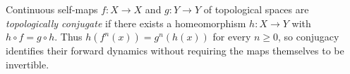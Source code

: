 
Continuous self-maps $f:X\to X$ and $g:Y\to Y$ of topological spaces are \emph{topologically conjugate} if there exists a homeomorphism $h:X\to Y$ with $h\circ f=g\circ h$. Thus $h(f^n(x))=g^n(h(x))$ for every $n\ge0$, so conjugacy identifies their forward dynamics without requiring the maps themselves to be invertible.
